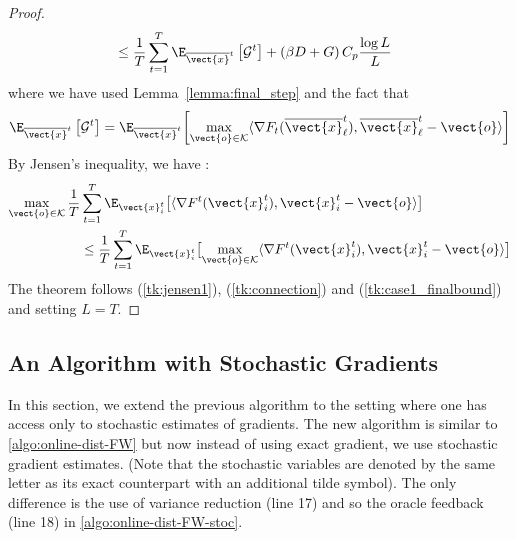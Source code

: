 \begin{proof}
\begin{align}
%
& \leq \frac{1}{T}\sum_{t=1}^{T} \E_{\overline{\vect{x}}^t} \left[\mathcal{G}^t\right] +  \left(\beta D + G \right) C_p \frac{\log L}{L}		
\end{align}
where we have used Lemma~\ref{lemma:final_step} and the fact that
\begin{align*}
    \E_{\overline{\vect{x}}^t} \left[\mathcal{G}^t\right] = \E_{\overline{\vect{x}}^t} {\left[\max_{\vect{o} \in \mathcal{K}}\langle \nabla F_t (\overline{\vect{x}}^t_{\ell}), \overline{\vect{x}}^t_{\ell} - \vect{o} \rangle \right]}
\end{align*}
By Jensen's inequality, we have :
    \begin{align} \label{tk:jensen1}
        \max_{\vect{o} \in \mathcal{K}} \frac{1}{T} &\sum_{t=1}^{T}  \E_{\vect{x}^t_i} \bigl [\langle \nabla F^{t}(\vect{x}^t_{i}), \vect{x}^t_{i} - \vect{o}\rangle \bigr] \notag \\
        & \leq \frac{1}{T}\sum_{t=1}^{T} \E_{\vect{x}^t_i} \bigl [ \max_{\vect{o} \in \mathcal{K}}\langle \nabla F^{t}(\vect{x}^t_{i}), \vect{x}^t_{i} - \vect{o}\rangle \bigr] 
    \end{align}
The theorem follows (\ref{tk:jensen1}), (\ref{tk:connection}) and (\ref{tk:case1_finalbound}) and setting $L=T$. 
\end{proof}

\subsection{An Algorithm with Stochastic Gradients}
In this section, we extend the previous algorithm to the setting where one has access only to stochastic estimates of gradients. The new algorithm is similar to \cref{algo:online-dist-FW} but now instead of using exact gradient, we use stochastic gradient estimates. (Note that the stochastic variables are denoted by the same letter as its exact counterpart with an additional tilde symbol). The only difference is the use of variance reduction (line 17) and so the oracle feedback (line 18) in \cref{algo:online-dist-FW-stoc}. 

